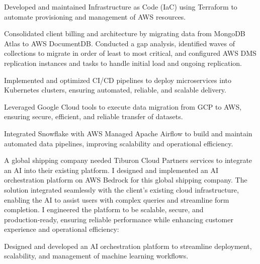 \begin{cventries}
{      \begin{cvitems}
          \item []
          \item Developed and maintained Infrastructure as Code (IaC) using Terraform to automate provisioning and management of AWS resources.
          \item Consolidated client billing and architecture by migrating data from MongoDB Atlas to AWS DocumentDB. Conducted a gap analysis, identified waves of collections to migrate in order of least to most critical, and configured AWS DMS replication instances and tasks to handle initial load and ongoing replication.
          \item Implemented and optimized CI/CD pipelines to deploy microservices into Kubernetes clusters, ensuring automated, reliable, and scalable delivery.
          \item Leveraged Google Cloud tools to execute data migration from GCP to AWS, ensuring secure, efficient, and reliable transfer of datasets.
          \item Integrated Snowflake with AWS Managed Apache Airflow to build and maintain automated data pipelines, improving scalability and operational efficiency.
      \end{cvitems}
          A global shipping company needed Tiburon Cloud Partners services to integrate an AI into their existing platform. I designed and implemented an AI orchestration platform on AWS Bedrock for this global shipping company. The solution integrated seamlessly with the client’s existing cloud infrastructure, enabling the AI to assist users with complex queries and streamline form completion. I engineered the platform to be scalable, secure, and production‑ready, ensuring reliable performance while enhancing customer experience and operational efficiency:
      \begin{cvitems}
          \item[]
          \item Designed and developed an AI orchestration platform to streamline deployment, scalability, and management of machine learning workflows.
      \end{cvitems}
    }


\end{cventries}
